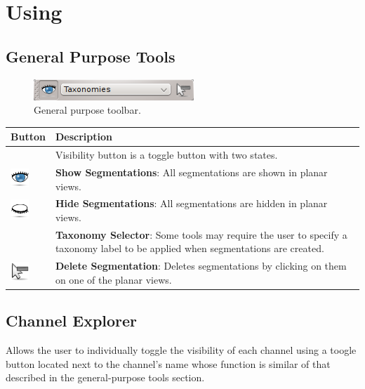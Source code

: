 \section{Using \espina}

\subsection{General Purpose Tools}
\begin{figure}[H]
\centering
\includegraphics{fig/MainToolbar}
\caption{General purpose toolbar.}
\end{figure}

\begin{tabular}{| m{1.3cm} | m{12cm} |}
\hline
\textbf{Button} & \textbf{Description}\\
\hline
& Visibility button is a toggle button with two states.\\ 
\includegraphics[width=0.7cm]{../../frontend/rsc/show_all} &
\textbf{Show Segmentations}: All segmentations are shown in planar views.\\
\includegraphics[width=0.7cm]{../../frontend/rsc/hide_all} &
\textbf{Hide Segmentations}: All segmentations are hidden in planar views.\\
\hline
 & %
\textbf{Taxonomy Selector}: Some tools may require the user to specify a
taxonomy label to be applied when segmentations are created.\\
\hline
\includegraphics[width=0.7cm]{../../frontend/rsc/removeSeg} &
\textbf{Delete Segmentation}: Deletes segmentations by clicking on them on one of the planar views.\\
\hline
\end{tabular}

\subsection{Channel Explorer}
Allows the user to individually toggle the visibility of each channel using a toogle button
located next to the channel's name whose function is similar of that described in the
general-purpose tools section.

